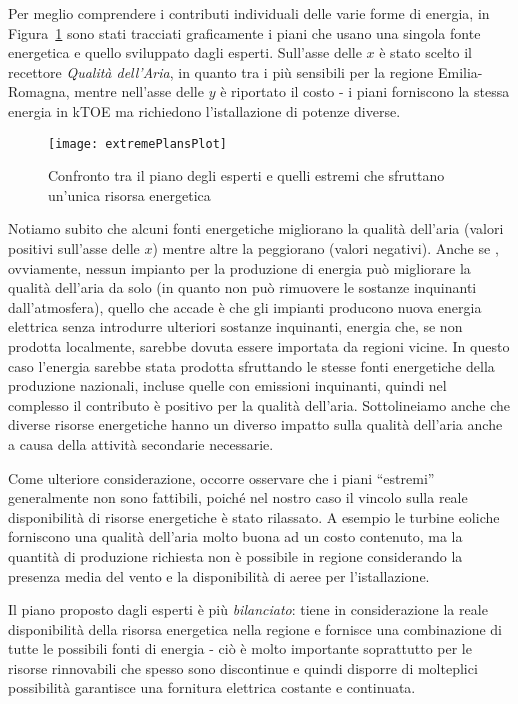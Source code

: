 \documentclass[12pt,a4paper,openright,twoside]{report}
\begin{document}
Per meglio comprendere i contributi individuali delle varie forme di energia, in Figura~\ref{extremePlansPlot} sono stati tracciati graficamente i piani che usano una singola fonte energetica e quello sviluppato dagli esperti. Sull'asse delle $x$ è stato scelto il recettore \emph{Qualità dell'Aria}, in quanto tra i più sensibili per la regione Emilia-Romagna, mentre nell'asse delle $y$ è riportato il costo - i piani forniscono la stessa energia in kTOE ma richiedono l'istallazione di potenze diverse.

\begin{figure}[h]
	\centering
	\texttt{[image: extremePlansPlot]}
	\caption{Confronto tra il piano degli esperti e quelli estremi che sfruttano un'unica risorsa energetica}
	\label{extremePlansPlot}
\end{figure}

Notiamo subito che alcuni fonti energetiche migliorano la qualità dell'aria (valori positivi sull'asse delle $x$) mentre altre la peggiorano (valori negativi). Anche se , ovviamente, nessun impianto per la produzione di energia può migliorare la qualità dell'aria da solo (in quanto non può rimuovere le sostanze inquinanti dall'atmosfera), quello che accade è che gli impianti producono nuova energia elettrica senza introdurre ulteriori sostanze inquinanti, energia che, se non prodotta localmente, sarebbe dovuta essere importata da regioni vicine. In questo caso l'energia sarebbe stata prodotta sfruttando le stesse fonti energetiche della produzione nazionali, incluse quelle con emissioni inquinanti, quindi nel complesso il contributo è positivo per la qualità dell'aria. Sottolineiamo anche che diverse risorse energetiche hanno un diverso impatto sulla qualità dell'aria anche a causa della attività secondarie necessarie. 

Come ulteriore considerazione, occorre osservare che i piani ``estremi'' generalmente non sono fattibili, poiché nel nostro caso il vincolo sulla reale disponibilità di risorse energetiche è stato rilassato. A esempio le turbine eoliche forniscono una qualità dell'aria molto buona ad un costo contenuto, ma la quantità di produzione richiesta non è possibile in regione considerando la presenza media del vento e la disponibilità di aeree per l'istallazione.

Il piano proposto dagli esperti è più \emph{bilanciato}: tiene in considerazione la reale disponibilità della risorsa energetica nella regione e fornisce una combinazione di tutte le possibili fonti di energia - ciò è molto importante soprattutto per le risorse rinnovabili che spesso sono discontinue e quindi disporre di molteplici possibilità garantisce una fornitura elettrica costante e continuata.
\end{document}
